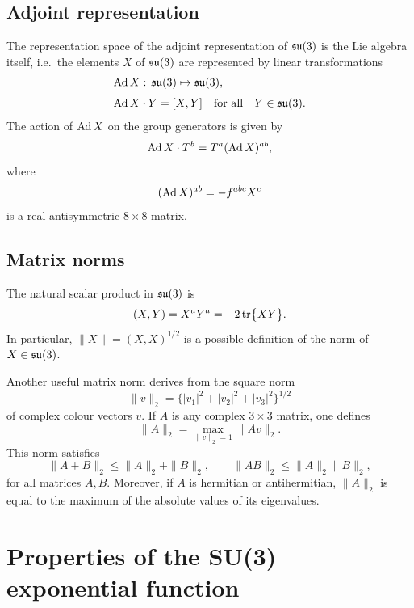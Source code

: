 \subsection{Adjoint representation}

The representation space of the adjoint representation of $\mathfrak{su}(3)$
is the Lie algebra itself,
i.e.\ the elements $X$ of $\mathfrak{su}(3)$ are represented by linear
transformations
\begin{align}
  &\mathrm{Ad}\, X:\,\mathfrak{su}(3)\mapsto\mathfrak{su}(3),
  \\[0.8ex]
  &\mathrm{Ad}\, X\cdot Y=[X,Y]\quad\text{for all}\quad Y\in\mathfrak{su}(3).
\end{align}
The action of $\mathrm{Ad}\, X$ on the group generators
is given by
\begin{equation}
  \mathrm{Ad}\, X\cdot T^b=T^a(\mathrm{Ad}\, X)^{ab},
\end{equation}
where
\begin{equation}
  (\mathrm{Ad}\, X)^{ab}=-f^{abc}X^c
\end{equation}
is a real antisymmetric $8\times 8$ matrix.


\subsection{Matrix norms}

The natural scalar product in $\mathfrak{su}(3)$ is
\begin{equation}
  (X,Y)=X^aY^a=-2\,\mathrm{tr}\bigl\{XY\bigr\}.
\end{equation}
In particular, $\|X\|=(X,X)^{1/2}$ is a possible definition of
the norm of $X\in\mathfrak{su}(3)$.

Another useful matrix norm derives from the square norm
\begin{equation}
  \|v\|_2=\bigl\{|v_1|^2+|v_2|^2+|v_3|^2\bigr\}^{1/2}
\end{equation}
of complex colour vectors $v$. If $A$ is any complex $3\times3$ matrix,
one defines
\begin{equation}
  \|A\|_2=\max_{\|v\|_2=1}\|Av\|_2.
\end{equation}
This norm satisfies
\begin{equation}
   \|A+B\|_2\leq\|A\|_2+\|B\|_2,
   \qquad
   \|AB\|_2\leq\|A\|_2\|B\|_2,
\end{equation}
for all matrices $A,B$. Moreover, if $A$ is hermitian or
antihermitian, $\|A\|_2$ is equal to the maximum of the absolute
values of its eigenvalues.

\section{Properties of the SU(3) exponential function}

